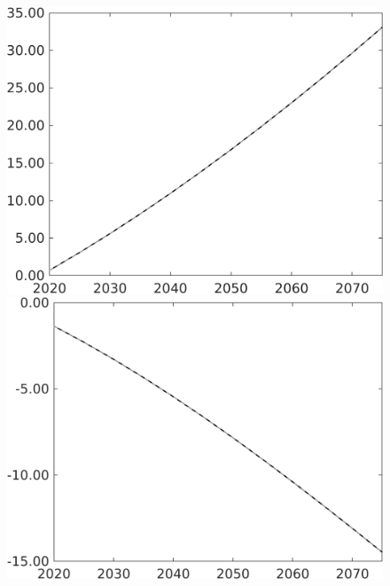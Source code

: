 \documentclass[12pt]{article}
\begin{document}
\begin{figure}[h!!]
\begin{minipage}[]{0.32\textwidth}
	\end{minipage}	
	\begin{minipage}[]{0.32\textwidth}
		\includegraphics[width=1\textwidth]{../../codding_model/own_basedOnFried/optimalPol_010922_revision/figures/all_13Sept22/PerdifNoTauf_regime0_CompTaul_pf_spillover0_nsk0_xgr0_knspil1_sep1_LFlimit0_emsbase0_countec0_GovRev0_etaa0.79_lgd0.png}
	\end{minipage}	
	\begin{minipage}[]{0.32\textwidth}
		\includegraphics[width=1\textwidth]{../../codding_model/own_basedOnFried/optimalPol_010922_revision/figures/all_13Sept22/PerdifNoTauf_regime0_CompTaul_pg_spillover0_nsk0_xgr0_knspil1_sep1_LFlimit0_emsbase0_countec0_GovRev0_etaa0.79_lgd0.png}

\end{minipage}
\end{figure}
\end{document}
